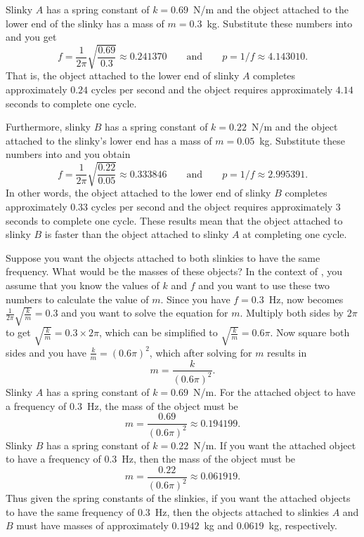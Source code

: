 \documentclass[a4paper,oneside,12pt]{article}
\begin{document}
\begin{problem}
{\begin{solution}
Slinky $A$ has a spring constant of $k = 0.69$~N/m and the object
attached to the lower end of the slinky has a mass of $m = 0.3$~kg.
Substitute these numbers into
 and you get
\[
f
=
\frac{1}{2\pi}
\sqrt{
  \frac{0.69}{0.3}
}
\approx
0.241370
\qquad
\text{and}
\qquad
p
=
1 / f
\approx
4.143010.
\]
That is, the object attached to the lower end of slinky $A$ completes
approximately $0.24$ cycles per second and the object requires
approximately $4.14$ seconds to complete one cycle.

Furthermore, slinky $B$ has a spring constant of $k = 0.22$~N/m and
the object attached to the slinky's lower end has a mass of
$m = 0.05$~kg.  Substitute these numbers into
 and you obtain
\[
f
=
\frac{1}{2\pi}
\sqrt{
  \frac{0.22}{0.05}
}
\approx
0.333846
\qquad
\text{and}
\qquad
p
=
1 / f
\approx
2.995391.
\]
In other words, the object attached to the lower end of slinky $B$
completes approximately $0.33$ cycles per second and the object
requires approximately $3$ seconds to complete one cycle.  These
results mean that the object attached to slinky $B$ is faster than the
object attached to slinky $A$ at completing one cycle.

Suppose you want the objects attached to both slinkies to have the
same frequency.  What would be the masses of these objects?  In the
context of , you assume
that you know the values of $k$ and $f$ and you want to use these two
numbers to calculate the value of $m$.  Since you have
$f = 0.3$~Hz,  now
becomes $\frac{1}{2\pi} \sqrt{\frac{k}{m}} = 0.3$ and you want to
solve the equation for $m$.  Multiply both sides by $2\pi$ to get
$\sqrt{\frac{k}{m}} = 0.3 \times 2\pi$, which can be simplified to
$\sqrt{\frac{k}{m}} = 0.6\pi$.  Now square both sides and you have
$\frac{k}{m} = (0.6\pi)^2$, which after solving for $m$ results in
\[
m
=
\frac{k}{(0.6\pi)^2}.
\]
Slinky $A$ has a spring constant of $k = 0.69$~N/m.  For the attached
object to have a frequency of $0.3$~Hz, the mass of the object must be
\[
m
=
\frac{0.69}{(0.6\pi)^2}
\approx
0.194199.
\]
Slinky $B$ has a spring constant of $k = 0.22$~N/m.  If you want the
attached object to have a frequency of $0.3$~Hz, then the mass of the
object must be
\[
m
=
\frac{0.22}{(0.6\pi)^2}
\approx
0.061919.
\]
Thus given the spring constants of the slinkies, if you want the
attached objects to have the same frequency of $0.3$~Hz, then the
objects attached to slinkies $A$ and $B$ must have masses of
approximately $0.1942$~kg and $0.0619$~kg, respectively.


\end{solution}}
\end{problem}
\end{document}
